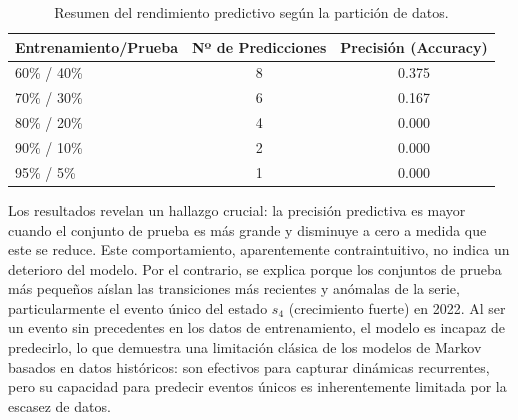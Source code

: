 \begin{table}[H]
\centering
\begin{tabularx}{\textwidth}{X c c}
\hline
\textbf{Entrenamiento/Prueba} & \textbf{Nº de Predicciones} & \textbf{Precisión (Accuracy)} \\
\hline
60\% / 40\% & 8 & 0.375 \\
70\% / 30\% & 6 & 0.167 \\
80\% / 20\% & 4 & 0.000 \\
90\% / 10\% & 2 & 0.000 \\
95\% / 5\%  & 1 & 0.000 \\
\hline
\end{tabularx}
\caption{Resumen del rendimiento predictivo según la partición de datos.}
\label{tab:rendimiento_predictivo_resumen}
\end{table}

Los resultados revelan un hallazgo crucial: la precisión predictiva es mayor cuando el conjunto de prueba es más grande y disminuye a cero a medida que este se reduce. Este comportamiento, aparentemente contraintuitivo, no indica un deterioro del modelo. Por el contrario, se explica porque los conjuntos de prueba más pequeños aíslan las transiciones más recientes y anómalas de la serie, particularmente el evento único del estado $s_4$ (crecimiento fuerte) en 2022. Al ser un evento sin precedentes en los datos de entrenamiento, el modelo es incapaz de predecirlo, lo que demuestra una limitación clásica de los modelos de Markov basados en datos históricos: son efectivos para capturar dinámicas recurrentes, pero su capacidad para predecir eventos únicos es inherentemente limitada por la escasez de datos.

